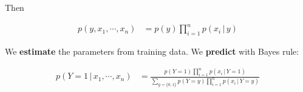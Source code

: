 \documentclass{article}
\begin{document}
Then

\begin{align}
    p(y, x_{1}, \cdots , x_{n}) &= p(y) \prod_{i=1}^{n}p(x_{i}\,| \,y)
\end{align}

We \textbf{estimate} the parameters from training data.
We \textbf{predict} with Bayes rule:

\begin{align}
    p(Y = 1 \, | \, x_{1}, \cdots , x_{n}) &= 
     \frac{p(Y=1)\prod_{i=1}^{n}p(x_{i} \, | \, Y = 1)}{\sum_{y=\{0,1\}}p(Y=y)\prod_{i=1}^{n}p(x_{i} \, | \, Y = y)}
\end{align}
\end{document}
